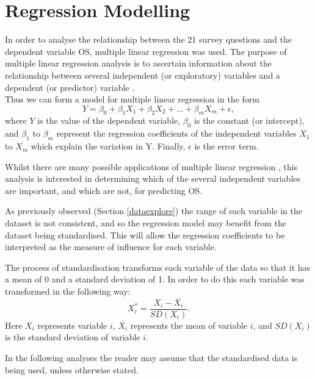 \documentclass[11pt,a4paper]{report}
\begin{document}
\section{Regression Modelling}
In order to analyse the relationship between the 21 survey questions and the dependent variable \ac{OS}, multiple linear regression was used. 
The purpose of multiple linear regression analysis is to ascertain information about the relationship between several independent (or exploratory) variables and a dependent (or predictor) variable \cite{pearson1908}. \\ Thus we can form a model for multiple linear regression in the form \[ Y = \beta_{0} + \beta_{1}X_{1} + \beta_{2}X_{2} + ... + \beta_{m}X_{m} + \epsilon , \] 
where $Y$ is the value of the dependent variable, $ \beta_{0} $ is the constant (or intercept), and $ \beta_{1} $ to $ \beta_{m} $ represent the regression coefficients of the independent variables $ X_{1} $ to $X_{m} $ which explain the variation in Y. Finally, $ \epsilon $ is the error term. 

Whilst there are many possible applications of multiple linear regression \cite{AppliedRegAnalysis}, this analysis is interested in determining which of the several independent variables are important, and which are not, for predicting \ac{OS}. 

As previously observed (Section \ref{dataexplore}) the range of each variable in the dataset is not consistent, and so the regression model may benefit from the dataset being standardised. This will allow the regression coefficients to be interpreted as the measure of influence for each variable.  

The process of standardisation transforms each variable of the data so that it has a mean of 0 and a standard deviation of 1. In order to do this each variable was transformed in the following way:
\[ X^{*}_{i} = \frac{X_{i} - \overline{X_{i}}}{SD(X_{i})}. \]
Here $ X_{i} $ represents variable $i$, $\overline{X_{i}}$ represents the mean of variable $i$, and $SD(X_{i})$ is the standard deviation of variable $i$.

In the following analyses the reader may assume that the standardised data is being used, unless otherwise stated.  
\end{document}
